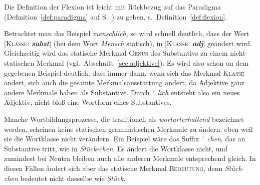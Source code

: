 
Die Definition der Flexion ist leicht mit Rückbezug auf das Paradigma (Definition~\ref{def:paradigma} auf S.~\pageref{def:paradigma}) zu geben, s.\ Definition~\ref{def:flexion}.



Betrachtet man das Beispiel \textit{menschlich}, so wird schnell deutlich, dass der Wert [\textsc{Klasse}: \textit{\textbf{subst}}] (bei dem Wort \textit{Mensch} statisch), in [\textsc{Klasse}: \textit{\textbf{adj}}] geändert wird.
Gleichzeitig wird das statische Merkmal \textsc{Genus} des Substantivs zu einem nicht-statischen Merkmal (vgl.\ Abschnitt~\ref{sec:adjektive}).
Es wird also schon an dem gegebenen Beispiel deutlich, dass immer dann, wenn sich das Merkmal \textsc{Klasse} ändert, sich auch die gesamte Merkmalsausstattung ändert, da Adjektive \zB ganz andere Merkmale haben als Substantive.
Durch \mbox{\textit{\char`~lich}} entsteht also ein neues Adjektiv, nicht bloß eine Wortform eines Substantives.

Manche Wortbildungsprozesse, die traditionell als \textit{wortarterhaltend} bezeichnet werden, scheinen keine statischen grammatischen Merkmale zu ändern, eben weil sie die Wortklasse nicht verändern.
Ein Beispiel wäre das Suffix \mbox{\textit{\char`~chen}}, das an Substantive tritt, wie in \textit{Stück-chen}.
Es ändert die Wortklasse nicht, und zumindest bei Neutra bleiben auch alle anderen Merkmale entsprechend gleich.
In diesen Fällen ändert sich aber das statische Merkmal \textsc{Bedeutung}, denn \textit{Stück-chen} bedeutet nicht dasselbe wie \textit{Stück}.

